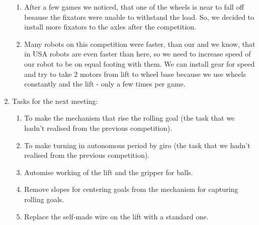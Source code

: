 \begin{enumerate}
\begin{enumerate}
		\item After a few games we noticed, that one of the wheels is near to fall off besause the fixators were unable to withstand the load. So, we decided to install more fixators to the axles after the competition.
		
		\item Many robots on this competition were faster, than our and we know, that in USA robots are even faster than here, so we need to increase speed of our robot to be on equal footing with them. We can install gear for speed and try to take 2 motors from lift to wheel base because we use wheels constantly and the lift - only a few times per game.
		
	\end{enumerate}
	
	
	\item Tasks for the next meeting:
	\begin{enumerate}
		\item To make the mechanism that rise the rolling goal (the task that we hadn't realised from the previous competition).
		
		\item To make turning in autonomous period by giro (the task that we hadn't realised from the previous competition).
		
		\item Automise working of the lift and the gripper for balls.
		
		\item Remove slopes for centering goals from the mechanism for capturing rolling goals.
		
		\item Replace the self-made wire on the lift with a standard one.
		

\end{enumerate}
\end{enumerate}
